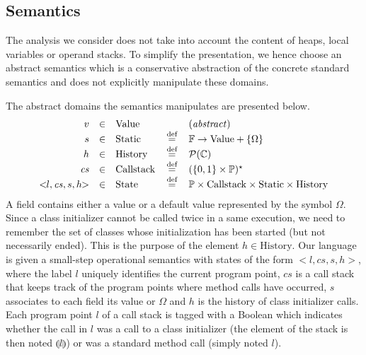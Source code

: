 \documentclass{entcs}
\begin{document}
\subsection{Semantics}
\label{sec:semantics}

\newcommand{\Pow}{\mathcal{P}}
\newcommand{\eqdef}{\,\stackrel{\textrm{\scriptsize def}}{=}\,}
\newcommand{\Ref}{\mathrm{Location}}
\newcommand{\Value}{\mathrm{Value}}
\newcommand{\Local}{\mathrm{Local}}
\newcommand{\OpStack}{\mathrm{OpStack}}
\newcommand{\Dynamics}{\mathrm{Dynamics}}
\newcommand{\Heap}{\mathrm{Heap}}
\newcommand{\Static}{\mathrm{Static}}
\newcommand{\Frame}{\mathrm{Frame}}
\newcommand{\State}{\mathrm{State}}
\newcommand{\IntraState}{\State_{\mathrm{intra}}}
\newcommand{\FinalState}{\State_{\mathrm{final}}}
\newcommand{\History}{\mathrm{History}}
\newcommand{\CallStack}{\mathrm{Callstack}}
\newcommand{\st}[1]{<\!\!#1\!\!>}
\newcommand{\fr}{\mathit{fr}} \newcommand{\cs}{\mathit{cs}}
\newcommand{\hist}{h}\newcommand{\stt}{\mathit{st}} \newcommand{\os}{\mathit{os}}
\newcommand{\cons}{\!::\!}  \newcommand{\undef}{\Omega}
\newcommand{\nil}{\varepsilon} \newcommand{\marked}[1]{\llparenthesis
  #1 \rrparenthesis}

The analysis we consider does not take into account the content of
heaps, local variables or operand stacks.  To simplify the
presentation, we hence choose an abstract semantics which is a
conservative abstraction of the concrete standard semantics and does
not explicitly manipulate these domains.

The abstract domains the semantics manipulates are presented below.
$$
\begin{array}{rclcl}
v    &\in& \Value &      & (\mathit{abstract}) \\
s    &\in& \Static&\eqdef& \fields \to \Value+\{\undef\}\\\hist  &\in& \History&\eqdef& \Pow(\class) \\
\cs &\in& \CallStack &\eqdef& (\{0,1\}\times\ppt)^\star\\
  \st{l,\cs,s,\hist}&\in& \State & \eqdef & \ppt\times\CallStack\times\Static\times\History\\ \end{array}
$$
A field contains either a value or a default value represented by the
symbol $\undef$.  Since a class initializer cannot be called twice in a
same execution, we need to remember the set of classes whose
initialization has been started (but not necessarily ended).  This
is the purpose of the element $h\in\History$.  Our language is given a
small-step operational semantics with states of the form
$\st{l,\cs,s,\hist}$, where the label $l$ uniquely identifies the
current program point, $\cs$ is a call stack that keeps track of the
program points where method calls have occurred, $s$ associates to
each field its value or $\undef$ and $\hist$ is the history of class
initializer calls.  Each program point $l$ of a call stack is tagged
with a Boolean which indicates whether the call in $l$ was a call to a
class initializer (the element of the stack is then noted
$\marked{l}$) or was a standard method call (simply noted ${l}$).
\end{document}
